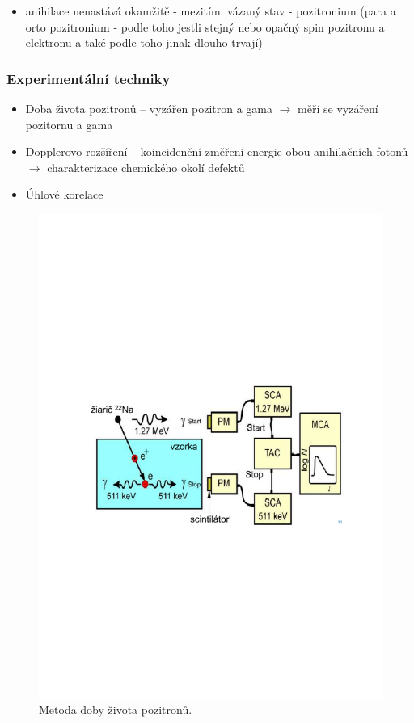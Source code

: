\begin{itemize}
    \item anihilace nenastává okamžitě - mezitím: vázaný stav - pozitronium (para a orto pozitronium - podle toho jestli stejný nebo opačný spin pozitronu a elektronu a také podle toho jinak dlouho trvají)
\end{itemize}

\subsubsection{Experimentální techniky}

\begin{itemize}
    \item Doba života pozitronů -- vyzářen pozitron a gama $\rightarrow$ měří se vyzáření pozitornu a gama
    \item Dopplerovo rozšíření -- koincidenční změření energie obou anihilačních fotonů $\rightarrow$ charakterizace chemického okolí defektů
    \item Úhlové korelace
\end{itemize}

\begin{figure}[H]
    \centering
    \includegraphics[width=0.8\linewidth, trim={2cm 10cm 2cm 10cm}, clip]{img/pas_doba_zivota.pdf}
    \caption{Metoda doby života pozitronů.}
    \label{fig:6_2_pas_doba_zivota}
\end{figure}

